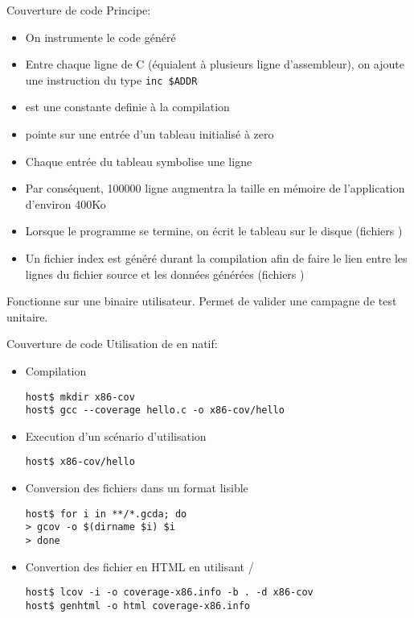 \begin{frame}[fragile=singleslide]{Couverture de code}
  Principe:
  \begin{itemize}
  \item On instrumente le code généré
  \item Entre chaque ligne de C (équialent à plusieurs ligne
    d'assembleur), on ajoute une instruction du type \verb/inc $ADDR/
  \item {} est une constante definie à la compilation
  \item {} pointe sur une entrée d'un tableau initialisé à zero
  \item Chaque entrée du tableau symbolise une ligne
  \item Par conséquent, 100000 ligne augmentra la taille en mémoire de
    l'application d'environ 400Ko
  \item Lorsque le programme se termine, on écrit le tableau sur le
    disque (fichiers )
  \item Un fichier index est généré durant la compilation afin de faire
    le lien entre les lignes du fichier source et les données générées
    (fichiers )
  \end{itemize}
  Fonctionne sur une binaire utilisateur. 
  Permet de valider une campagne de test unitaire.
\end{frame}

\begin{frame}[fragile=singleslide]{Couverture de code}
  Utilisation de  en natif:
  \begin{itemize}
  \item Compilation
    \begin{lstlisting}
host$ mkdir x86-cov
host$ gcc --coverage hello.c -o x86-cov/hello
    \end{lstlisting} 
  \item Execution d'un scénario d'utilisation
    \begin{lstlisting}
host$ x86-cov/hello
    \end{lstlisting} 
  \item Conversion des fichiers   dans un format lisible
    \begin{lstlisting}
host$ for i in **/*.gcda; do
> gcov -o $(dirname $i) $i
> done
    \end{lstlisting} 
  \item  Convertion  des  fichier   en  HTML  en  utilisant
    /
    \begin{lstlisting}
host$ lcov -i -o coverage-x86.info -b . -d x86-cov
host$ genhtml -o html coverage-x86.info
    \end{lstlisting} 
  \end{itemize}
\end{frame}
  
